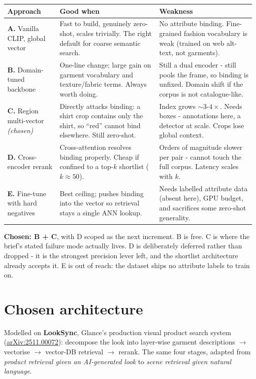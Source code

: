 \documentclass[10pt,a4paper]{article}
\begin{document}
\begin{tabularx}{\textwidth}{@{}p{22mm}YY@{}}
\toprule
\textbf{Approach} & \textbf{Good when} & \textbf{Weakness} \\
\midrule
\textbf{A.} Vanilla CLIP, global vector
& Fast to build, genuinely zero-shot, scales trivially. The right default for coarse semantic search.
& No attribute binding. Fine-grained fashion vocabulary is weak (trained on web alt-text, not garments). \\
\addlinespace
\textbf{B.} Domain-tuned backbone
& One-line change; large gain on garment vocabulary and texture/fabric terms. Always worth doing.
& Still a dual encoder - still pools the frame, so binding is unfixed. Domain shift if the corpus is not catalogue-like. \\
\addlinespace
\textbf{C.} Region multi-vector \emph{(chosen)}
& Directly attacks binding: a shirt crop contains only the shirt, so ``red'' cannot bind elsewhere. Still zero-shot.
& Index grows ${\sim}3\text{-}4\times$. Needs boxes - annotations here, a detector at scale. Crops lose global context. \\
\addlinespace
\textbf{D.} Cross-encoder rerank
& Cross-attention resolves binding properly. Cheap if confined to a top-$k$ shortlist ($k{\approx}50$).
& Orders of magnitude slower per pair - cannot touch the full corpus. Latency scales with $k$. \\
\addlinespace
\textbf{E.} Fine-tune with hard negatives
& Best ceiling; pushes binding into the vector so retrieval stays a single ANN lookup.
& Needs labelled attribute data (absent here), GPU budget, and sacrifices some zero-shot generality. \\
\bottomrule
\end{tabularx}

\vspace{3mm}
\textbf{Chosen: B + C}, with D scoped as the next increment. B is free. C is where the
brief's stated failure mode actually lives. D is deliberately deferred rather than
dropped - it is the strongest precision lever left, and the shortlist architecture
already accepts it. E is out of reach: the dataset ships no attribute labels to train on.

\section{Chosen architecture}

Modelled on \textbf{LookSync}, Glance's production visual product search system
(\href{https://arxiv.org/abs/2511.00072}{arXiv:2511.00072}): decompose the look into
layer-wise garment descriptions $\rightarrow$ vectorise $\rightarrow$ vector-DB
retrieval $\rightarrow$ rerank. The same four stages, adapted from \emph{product
retrieval given an AI-generated look} to \emph{scene retrieval given natural language}.
\end{document}
